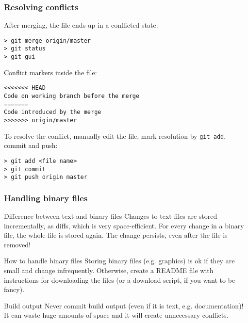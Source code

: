 \begin{frame}[fragile]
	\frametitle{Resolving conflicts}
	
	After merging, the file ends up in a conflicted state:
	\begin{verbatim}
> git merge origin/master
> git status
> git gui
	\end{verbatim}	
	
	Conflict markers inside the file:
	\begin{verbatim}
<<<<<<< HEAD
Code on working branch before the merge
=======
Code introduced by the merge
>>>>>>> origin/master
	\end{verbatim}

	To resolve the conflict, manually edit the file, mark resolution by \texttt{git add}, commit and push:
	\begin{verbatim}
> git add <file name>
> git commit
> git push origin master
	\end{verbatim}
	
\end{frame}


\begin{frame}[fragile]
	\frametitle{Handling binary files}
	
	\begin{block}{Difference between text and binary files}
	Changes to text files are stored incrementally, as diffs, which is very space-efficient. For every change in a binary file, the whole file is stored again. The change persists, even after the file is removed!
	\end{block}
	
	\begin{block}{How to handle binary files}
	Storing binary files (e.g. graphics) is ok if they are small and change infrequently. Otherwise, create a README file with instructions for downloading the files (or a download script, if you want to be fancy).
	\end{block}
	
	\begin{block}{Build output}
	\alert{Never} commit build output (even if it is text, e.g. documentation)! It can waste \alert{huge} amounts of space and it will create unnecessary conflicts.
	\end{block}
\end{frame}

